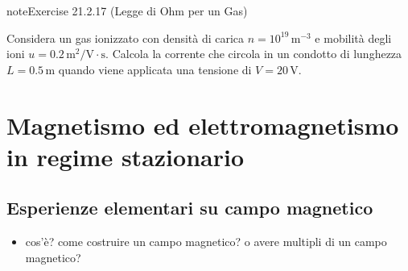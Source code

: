 \documentclass[letterpaper,10pt,italian]{jupyterBook}
\begin{document}
\begin{sphinxadmonition}{note}{Exercise 21.2.17 (Legge di Ohm per un Gas)}



\sphinxAtStartPar
Considera un gas ionizzato con densità di carica \(n = 10^{19} \, \text{m}^{-3}\) e mobilità degli ioni \(u = 0.2 \, \text{m}^2/\text{V} \cdot \text{s}\). Calcola la corrente che circola in un condotto di lunghezza \(L = 0.5 \, \text{m}\) quando viene applicata una tensione di \(V = 20 \, \text{V}\).
\end{sphinxadmonition}

\sphinxstepscope


\section{Magnetismo ed elettromagnetismo in regime stazionario}
\label{\detokenize{ch/electromagnetism/electromagnetism-steady:magnetismo-ed-elettromagnetismo-in-regime-stazionario}}\label{\detokenize{ch/electromagnetism/electromagnetism-steady:physics-hs-electromagnetism-electromagnetism-steady}}\label{\detokenize{ch/electromagnetism/electromagnetism-steady::doc}}

\subsection{Esperienze elementari su campo magnetico}
\label{\detokenize{ch/electromagnetism/electromagnetism-steady:esperienze-elementari-su-campo-magnetico}}\label{\detokenize{ch/electromagnetism/electromagnetism-steady:physics-hs-electromagnetism-electromagnetism-steady-experience}}\begin{itemize}
\item {} 
\sphinxAtStartPar
cos’è? come costruire un campo magnetico? o avere multipli di un campo magnetico?

\end{itemize}
\end{document}
